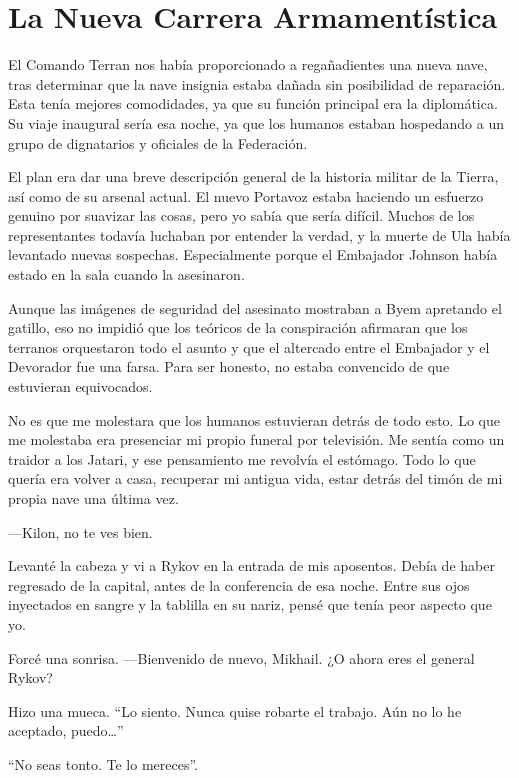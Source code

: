 \chapter{La Nueva Carrera Armamentística}\label{sec:la-nueva-carrera-armamentistica}

El Comando Terran nos había proporcionado a regañadientes una nueva nave, tras determinar que la nave insignia estaba dañada sin posibilidad de reparación. Esta tenía mejores comodidades, ya que su función principal era la diplomática. Su viaje inaugural sería esa noche, ya que los humanos estaban hospedando a un grupo de dignatarios y oficiales de la Federación.

El plan era dar una breve descripción general de la historia militar de la Tierra, así como de su arsenal actual. El nuevo Portavoz estaba haciendo un esfuerzo genuino por suavizar las cosas, pero yo sabía que sería difícil. Muchos de los representantes todavía luchaban por entender la verdad, y la muerte de Ula había levantado nuevas sospechas. Especialmente porque el Embajador Johnson había estado en la sala cuando la asesinaron.

Aunque las imágenes de seguridad del asesinato mostraban a Byem apretando el gatillo, eso no impidió que los teóricos de la conspiración afirmaran que los terranos orquestaron todo el asunto y que el altercado entre el Embajador y el Devorador fue una farsa. Para ser honesto, no estaba convencido de que estuvieran equivocados.

No es que me molestara que los humanos estuvieran detrás de todo esto. Lo que me molestaba era presenciar mi propio funeral por televisión. Me sentía como un traidor a los Jatari, y ese pensamiento me revolvía el estómago. Todo lo que quería era volver a casa, recuperar mi antigua vida, estar detrás del timón de mi propia nave una última vez.

—Kilon, no te ves bien.

Levanté la cabeza y vi a Rykov en la entrada de mis aposentos. Debía de haber regresado de la capital, antes de la conferencia de esa noche. Entre sus ojos inyectados en sangre y la tablilla en su nariz, pensé que tenía peor aspecto que yo.

Forcé una sonrisa. —Bienvenido de nuevo, Mikhail. ¿O ahora eres el general Rykov?

Hizo una mueca. ``Lo siento. Nunca quise robarte el trabajo. Aún no lo he aceptado, puedo…''

``No seas tonto. Te lo mereces''.


